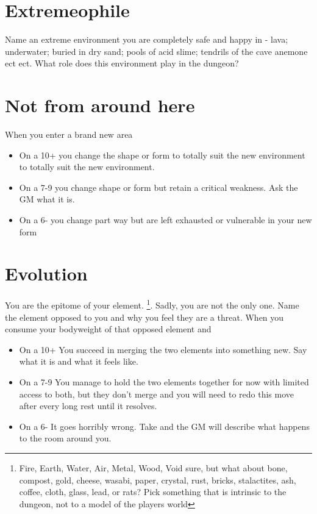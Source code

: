 \documentclass{tufte-book}
\begin{document}
\section{Extremeophile} 
Name an extreme environment you are completely safe and happy in - lava; underwater; buried in dry sand; pools of acid slime; tendrils of the cave anemone ect ect. What role does this environment play in the dungeon?

\section{Not from around here} 
When you enter a brand new area 
\begin{itemize} 
\item On a 10+ you change the shape or form to totally suit the new environment to totally suit the new environment.
\item On a 7-9 you change shape or form but retain a critical weakness. Ask the GM what it is.
\item On a 6- you change part way but are left exhausted or vulnerable in your new form
\end{itemize}

\section{Evolution} 
You are the epitome of your element. \footnote{Fire, Earth, Water, Air, Metal, Wood, Void sure, but what about bone, compost, gold, cheese, wasabi, paper, crystal, rust, bricks, stalactites, ash, coffee, cloth, glass, lead, or rats? Pick something that is intrinsic to the dungeon, not to a model of the players world }. Sadly, you are not the only one. Name the element opposed to you and why you feel they are a threat.
When you consume your bodyweight of that opposed element  and 
\begin{itemize}
\item On a 10+ You succeed in merging the two elements into something new. Say what it is and what it feels like.
\item On a 7-9 You manage to hold the two elements together for now with limited access to both, but they don't merge and you will need to redo this move after every long rest until it resolves.
\item On a 6- It goes horribly wrong. Take  and the GM will describe what happens to the room around you.
 \end{itemize}
\end{document}
